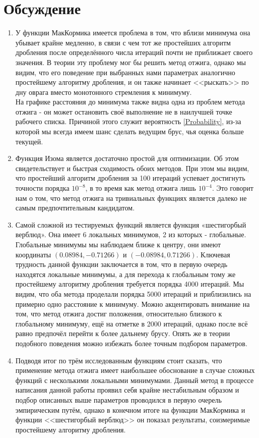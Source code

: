 \section{Обсуждение}
\begin{enumerate}
    \item У функции МакКормика имеется проблема в том, что вблизи минимума она убывает крайне медленно, в связи с чем тот же простейших алгоритм дробления после определённого числа итераций почти не приближает своего значения. В теории эту проблему мог бы решить метод отжига, однако мы видим, что его поведение при выбранных нами параметрах аналогично простейшему алгоритму дробления, и он также начинает <<рыскать>> по дну оврага вместо монотонного стремления к минимуму.\\
    На графике расстояния до минимума также видна одна из проблем метода отжига - он может остановить своё выполнение не в наилучшей точке рабочего списка. Причиной этого служит вероятность \eqref{Probability}, из-за которой мы всегда имеем шанс сделать ведущим брус, чья оценка больше текущей.
    \item Функция Изома является достаточно простой для оптимизации. Об этом свидетельствует и быстрая сходимость обоих методов. При этом мы видим, что простейший алгоритм дробления за 100 итераций успевает достигнуть точности порядка $10^{-8}$, в то время как метод отжига лишь $10^{-4}$. Это говорит нам о том, что метод отжига на тривиальных функциях является далеко не самым предпочтительным кандидатом.
    \item Самой сложной из тестируемых функций является функция «шестигорбый верблюд». Она имеет 6 локальных минимумов, 2 из которых - глобальные. Глобальные минимумы мы наблюдаем ближе к центру, они имеют координаты $(0.08984, -0.71266)$ и $(-0.08984, 0.71266)$. Ключевая трудность данной функции заключается в том, что в первую очередь находятся локальные минимумы, а для перехода к глобальным тому же простейшему алгоритму дробления требуется порядка 4000 итераций. Мы видим, что оба метода проделали порядка 5000 итераций и приблизились на примерно одно расстояние к минимуму. Можно акцентировать внимание на том, что метод отжига достиг положения, относительно близкого к глобальному минимуму, ещё на отметке в 2000 итераций, однако после всё равно предпочёл перейти к более дальнему брусу. Опять же в теории подобного поведения можно избежать более точным подбором параметров.
    \item Подводя итог по трём исследованным функциям стоит сказать, что применение метода отжига имеет наибольшее обоснование в случае сложных функций с несколькими локальными минимумами. Данный метод в процессе написания данной работы проявил себя крайне нестабильным образом и подбор описанных выше параметров проводился в первую очерель эмпирическим путём, однако в конечном итоге на функции МакКормика и функции <<шестигорбый верблюд>> он показал результаты, соизмеримые простейшему алгоритму дробления.
\end{enumerate}